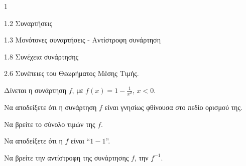 \begin{ylh}{1}
    \item 1.2 Συναρτήσεις
    \item 1.3 Μονότονες συναρτήσεις - Αντίστροφη συνάρτηση
    \item 1.8 Συνέχεια συνάρτησης
    \item 2.6 Συνέπειες του Θεωρήματος Μέσης Τιμής.
\end{ylh}
Δίνεται η συνάρτηση $f$, με $f(x) = 1 - \frac{1}{x^2}$, $x < 0$.
\begin{alist}
\item Να αποδείξετε ότι η συνάρτηση $f$ είναι γνησίως φθίνουσα στο πεδίο ορισμού της. 
\item Να βρείτε το σύνολο τιμών της $f$. 
\item
    \begin{rlist}
    \item Να αποδείξετε ότι η $f$ είναι ``$1-1$''. 
    \item Να βρείτε την αντίστροφη της συνάρτησης $f$, την $f^{-1}$. 
    \end{rlist}
\end{alist}